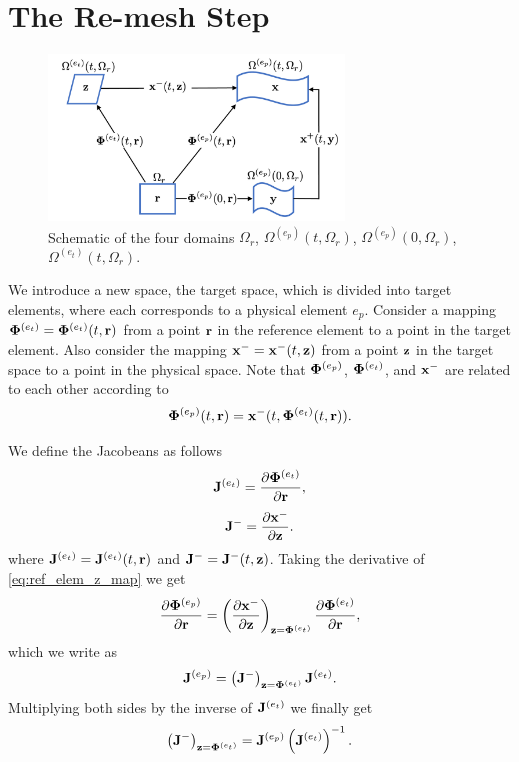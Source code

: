 \documentclass[11pt]{report}
\begin{document}
\chapter{The Re-mesh Step}
\begin{figure}[ht]
    \centering
    \includegraphics[width=0.7\textwidth]{../../images/four_spaces.pdf}
    \caption{Schematic of the four domains $\Omega_r$, $\Omega^{(e_p)}(t,\Omega_r)$, $\Omega^{(e_p)}(0,\Omega_r)$, $\Omega^{(e_t)}(t,\Omega_r)$.}
    \label{fig:four_spaces}
 \end{figure}
We introduce a new space, the target space, which is divided into target elements, where each corresponds to a physical element $e_p$. Consider a mapping $\bm \Phi^{(e_t)}=\bm \Phi^{(e_t)}(t,\mathbf{r})$ from a point $\mathbf{r}$ in the reference element to a point in the target element. Also consider the mapping $\mathbf{x}^- = \mathbf{x}^-(t,\mathbf{z})$ from a point $\mathbf{z}$ in the target space to a point in the physical space. Note that $\bm \Phi^{(e_p)}$, $\bm \Phi^{(e_t)}$, and $\mathbf{x}^-$ are related to each other according to
\begin{equation}
    \label{eq:ref_elem_z_map}
    \bm \Phi^{(e_p)}(t,\mathbf{r}) = \mathbf{x}^-(t,\bm \Phi^{(e_t)}(t,\mathbf{r})).
\end{equation}

We define the Jacobeans as follows
\begin{equation}
    \mathbf{J}^{(e_t)} = \frac{\partial \bm \Phi^{(e_t)}}{\partial \mathbf{r}},
\end{equation}
\begin{equation}
    \mathbf{J}^- = \frac{\partial \mathbf{x}^-}{\partial \mathbf{z}}.
\end{equation}
where $\mathbf{J}^{(e_t)} = \mathbf{J}^{(e_t)}(t,\mathbf{r})$ and $\mathbf{J}^-=\mathbf{J}^-(t,\mathbf{z})$. Taking the derivative of \cref{eq:ref_elem_z_map} we get
\begin{equation}
    \frac{\partial \bm \Phi^{(e_p)}}{\partial \mathbf{r}} = \left( \frac{ \partial \mathbf{x}^-}{\partial \mathbf{z}} \right)_{\mathbf{z}=\bm \Phi^{(e_t)}} \frac{ \partial \bm \Phi^{(e_t)} }{ \partial \mathbf{r}},
\end{equation}
which we write as
\begin{equation}
    \mathbf{J}^{(e_p)} = \left( \mathbf{J}^- \right)_{\mathbf{z}=\bm \Phi^{(e_t)}} \mathbf{J}^{(e_t)}.
\end{equation}
Multiplying both sides by the inverse of $\mathbf{J}^{(e_t)}$ we finally get
\begin{equation}
    \left( \mathbf{J}^- \right)_{\mathbf{z}=\bm \Phi^{(e_t)}} = \mathbf{J}^{(e_p)} \left( \mathbf{J}^{(e_t)} \right)^{-1}.
\end{equation}
\end{document}
